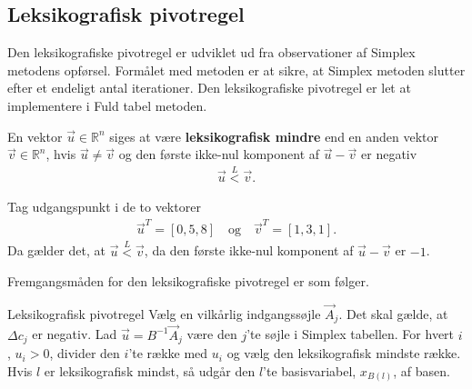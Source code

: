 \subsection{Leksikografisk pivotregel}
Den leksikografiske pivotregel er udviklet ud fra observationer af Simplex metodens opførsel. Formålet med metoden er at sikre, at Simplex metoden slutter efter et endeligt antal iterationer. 
Den leksikografiske pivotregel er let at implementere i Fuld tabel metoden. 
\begin{defn}
En vektor $\vec{u} \in \mathds{R}^n$ siges at være \textbf{leksikografisk mindre} end en anden vektor $\vec{v} \in \mathds{R}^n$, hvis $\vec{u} \neq \vec{v}$ og den første ikke-nul komponent af $\vec{u}-\vec{v}$ er negativ 
\begin{align*}
\vec{u} \overset{L}{<} \vec{v}.
\end{align*}
\end{defn}
\begin{eks}
Tag udgangspunkt i de to vektorer
\begin{align*}
\vec{u}^T=[0,5,8]\quad 
\text{og}
\quad \vec{v}^T=[1,3,1]. 
\end{align*}
Da gælder det, at $\vec{u} \overset{L}{<} \vec{v}$, da den første ikke-nul komponent af $\vec{u}-\vec{v}$ er $-1$.
\end{eks}

Fremgangsmåden for den leksikografiske pivotregel er som følger.
  
\begin{pro}{Leksikografisk pivotregel}
Vælg en vilkårlig indgangssøjle $\vec{A}_j$. Det skal gælde, at $\Delta c_j$ er negativ. Lad $\vec{u}=B^{-1}\vec{A}_j$ være den $j$'te søjle i Simplex tabellen.
For hvert $i$, $u_i>0$, divider den $i$'te række med $u_i$ og vælg den leksikografisk mindste række. 
Hvis $l$ er leksikografisk mindst, så udgår den $l$'te basisvariabel, $x_{B(l)}$, af basen. 
\end{pro}

